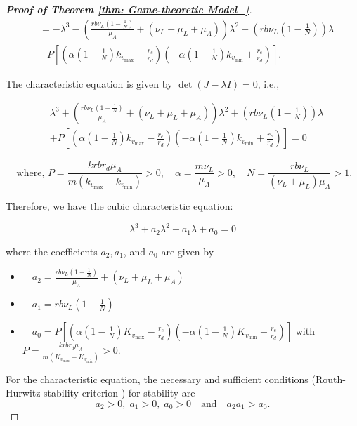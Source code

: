 \documentclass{article}
\theoremstyle{remark}
\theoremstyle{custom} %
\begin{document}
\begin{proof}[\textbf{Proof of Theorem \ref{thm: Game-theoretic Model_}}]
$$
\begin{aligned}
& =-\lambda^3-\left(\frac{r b \nu_L \left(1-\frac{1}{N}\right)}{\mu_A}+\left(\nu_L+\mu_L+\mu_A\right)\right) \lambda^2-\left(r b \nu_L \left(1-\frac{1}{N}\right)\right) \lambda \\
& -P \left[\left(\alpha \left(1-\frac{1}{N}\right) k_{v_{\max }}-\frac{r_c}{r_d}\right)\left(-\alpha \left(1-\frac{1}{N}\right) k_{v_{\min }}+\frac{r_c}{r_d}\right)\right].
\end{aligned}
$$


The characteristic equation is given by $\operatorname{det}(J-\lambda I)=0$, i.e.,

$$
\begin{aligned}
& \lambda^3+\left(\frac{r b \nu_L \left(1-\frac{1}{N}\right)}{\mu_A}+\left(\nu_L+\mu_L+\mu_A\right)\right) \lambda^2+\left(r b \nu_L \left(1-\frac{1}{N}\right)\right) \lambda \\
& +P \left[\left(\alpha \left(1-\frac{1}{N}\right) k_{v_{\max }}-\frac{r_c}{r_d}\right)\left(-\alpha \left(1-\frac{1}{N}\right) k_{v_{\min }}+\frac{r_c}{r_d}\right)\right]=0
\end{aligned}
$$

$$
\text { where, } P=\frac{k r b r_d \mu_A}{m \left(k_{v_{\max }}-k_{v_{\min }}\right)}>0, \quad \alpha=\frac{m \nu_L}{\mu_A}>0, \quad N=\frac{r b \nu_L}{\left(\nu_L+\mu_L\right) \mu_A}>1.
$$

Therefore, we have the cubic characteristic equation:

$$
\lambda^3+a_2 \lambda^2+a_1 \lambda+a_0=0
$$

where the coefficients $a_2, a_1$, and $a_0$ are given by

\begin{itemize}
\item $ \quad a_2=\frac{r b \nu_L \left(1-\frac{1}{N}\right)}{\mu_A}+\left(\nu_L+\mu_L+\mu_A\right)$

\item $ \quad a_1=r b \nu_L \left(1-\frac{1}{N}\right)$

\item $ \quad a_0=P \left[\left(\alpha \left(1-\frac{1}{N}\right) K_{v_{\max }}-\frac{r_c}{r_d}\right)\left(-\alpha \left(1-\frac{1}{N}\right) K_{v_{\min }}+\frac{r_c}{r_d}\right)\right]$ with $P=\frac{k r  b r_d \mu_A}{m \left(K_{v_{\max }}-K_{v_{\min }}\right)}>0$.
\end{itemize}


For the characteristic equation, the necessary and sufficient conditions (Routh-Hurwitz stability criterion \cite{ogata2009modern}) for stability are
\begin{equation*}
a_2>0,\; a_1>0,\; a_0>0 \quad \text{and} \quad a_2 a_1>a_0 .
\end{equation*}



\end{proof}
\end{document}
